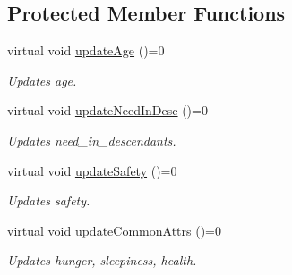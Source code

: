 \subsection*{Protected Member Functions}
\begin{DoxyCompactItemize}
\item 
virtual void \hyperlink{classCreature_a2f60a8f7e8c9432b3c91d91fbea6eb86}{update\-Age} ()=0
\begin{DoxyCompactList}\small\item\em Updates age. \end{DoxyCompactList}\item 
virtual void \hyperlink{classCreature_aa7e689cd7024701857bc069a8b1c3959}{update\-Need\-In\-Desc} ()=0
\begin{DoxyCompactList}\small\item\em Updates need\-\_\-in\-\_\-descendants. \end{DoxyCompactList}\item 
virtual void \hyperlink{classCreature_aa070b3e571a6f0ace18ac4774637e985}{update\-Safety} ()=0
\begin{DoxyCompactList}\small\item\em Updates safety. \end{DoxyCompactList}\item 
virtual void \hyperlink{classCreature_adc200567e6af258a7f6f1be4fbe029bc}{update\-Common\-Attrs} ()=0
\begin{DoxyCompactList}\small\item\em Updates hunger, sleepiness, health. \end{DoxyCompactList}\end{DoxyCompactItemize}
